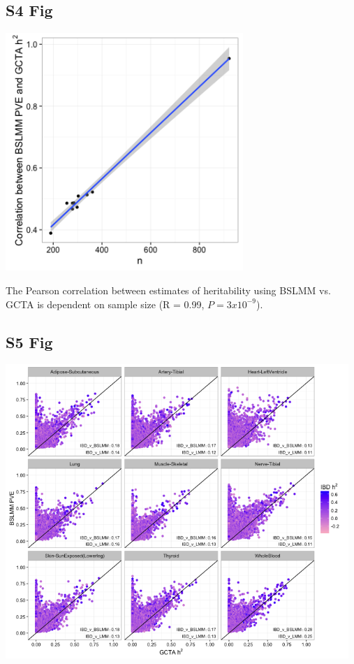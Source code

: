 \documentclass[10pt,letterpaper]{article}
\begin{document}
\begin{singlespace}
\subsection*{S4 Fig}
\includegraphics[width=9cm]{Figures/Fig-R_gcta_bslmm_v_n.png}
\label{S4_Fig}

 The Pearson correlation between estimates of heritability using BSLMM vs. GCTA is dependent on sample size (R = 0.99, $P = 3 x 10^{-9}$).

\subsection*{S5 Fig}
\includegraphics[width=13cm]{Figures/Fig-GTEx_TW_colorPriceh2bloodcis_pve_v_h2.png}
\label{S5_Fig}


\end{singlespace}
\end{document}
